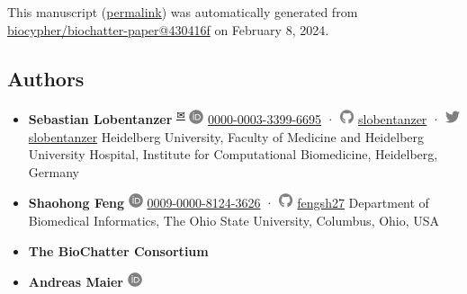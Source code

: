 This manuscript
(\href{https://biocypher.github.io/biochatter-paper/v/430416fe01350562f748be3ea9919a74b32554fc/}{permalink})
was automatically generated
from \href{https://github.com/biocypher/biochatter-paper/tree/430416fe01350562f748be3ea9919a74b32554fc}{biocypher/biochatter-paper@430416f}
on February 8, 2024.

\hypertarget{authors}{%
\subsection{Authors}\label{authors}}

\begin{itemize}
\item
  \textbf{Sebastian Lobentanzer}
  \textsuperscript{\protect\hyperlink{correspondence}{✉}}
  \includegraphics[width=0.16667in,height=0.16667in]{images/orcid.svg}
  \href{https://orcid.org/0000-0003-3399-6695}{0000-0003-3399-6695}
  · \includegraphics[width=0.16667in,height=0.16667in]{images/github.svg}
  \href{https://github.com/slobentanzer}{slobentanzer}
  · \includegraphics[width=0.16667in,height=0.16667in]{images/twitter.svg}
  \href{https://twitter.com/slobentanzer}{slobentanzer}
  Heidelberg University, Faculty of Medicine and Heidelberg University Hospital, Institute for Computational Biomedicine, Heidelberg, Germany
\item
  \textbf{Shaohong Feng}
  \includegraphics[width=0.16667in,height=0.16667in]{images/orcid.svg}
  \href{https://orcid.org/0009-0000-8124-3626}{0009-0000-8124-3626}
  · \includegraphics[width=0.16667in,height=0.16667in]{images/github.svg}
  \href{https://github.com/fengsh27}{fengsh27}
  Department of Biomedical Informatics, The Ohio State University, Columbus, Ohio, USA
\item
  \textbf{The BioChatter Consortium}
\item
  \textbf{Andreas Maier}
  \includegraphics[width=0.16667in,height=0.16667in]{images/orcid.svg}

\end{itemize}
